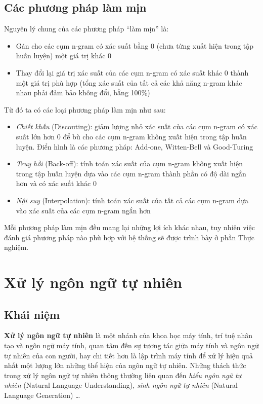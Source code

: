 \documentclass[12pt]{report}
\begin{document}
\subsection{Các phương pháp làm mịn}

Nguyên lý chung của các phương pháp ``làm mịn'' là:

\begin{itemize}
	\item Gán cho các cụm n-gram có xác suất bằng 0 (chưa từng xuất hiện trong tập huấn luyện) một giá trị khác 0
	\item Thay đổi lại giá trị xác suất của các cụm n-gram có xác suất khác 0 thành một giá trị phù hợp (tổng xác suất của tất cả các khả năng n-gram khác nhau phải đảm bảo không đổi, bằng 100\%)
\end{itemize}

\noindent Từ đó ta có các loại phương pháp làm mịn như sau:

\begin{itemize}
	\item \textit{Chiết khấu} (Discouting): giảm lượng nhỏ xác suất của các cụm n-gram có xác suất lớn hơn 0 để bù cho các cụm n-gram không xuất hiện trong tập huấn luyện. Điển hình là các phương pháp: Add-one, Witten-Bell và Good-Turing
	\item \textit{Truy hồi} (Back-off): tính toán xác suất của cụm n-gram không xuất hiện trong tập huấn luyện dựa vào các cụm n-gram thành phần có độ dài ngắn hơn và có xác suất khác 0
	\item \textit{Nội suy} (Interpolation): tính toán xác suất của tất cả các cụm n-gram dựa vào xác suất của các cụm n-gram ngắn hơn
\end{itemize}

Mỗi phương pháp làm mịn đều mang lại những lợi ích khác nhau, tuy nhiên việc đánh giá phương pháp nào phù hợp với hệ thống sẽ được trình bày ở phần Thực nghiệm.

\section{Xử lý ngôn ngữ tự nhiên}

\subsection{Khái niệm}

\textbf{Xử lý ngôn ngữ tự nhiên} là một nhánh của khoa học máy tính, trí tuệ nhân tạo và ngôn ngữ máy tính, quan tâm đến sự tương tác giữa máy tính và ngôn ngữ tự nhiên của con người, hay chi tiết hơn là lập trình máy tính để xử lý hiệu quả nhất một lượng lớn những thể hiện của ngôn ngữ tự nhiên. Những thách thức trong xử lý ngôn ngữ tự nhiên thông thường liên quan đến \textit{hiểu ngôn ngữ tự nhiên} (Natural Language Understanding), \textit{sinh ngôn ngữ tự nhiên} (Natural Language Generation) \ldots
\end{document}
